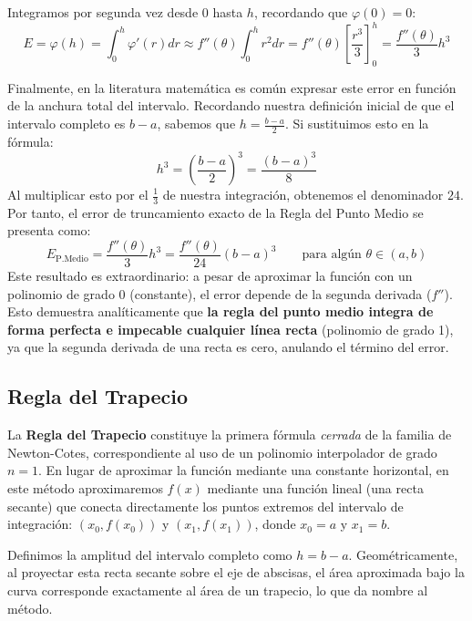 Integramos por segunda vez desde $0$ hasta $h$, recordando que $\varphi(0) = 0$:
\[
    E = \varphi(h) = \int_0^h \varphi'(r) dr \approx f''(\theta) \int_0^h r^2 dr = f''(\theta) \left[ \frac{r^3}{3} \right]_0^h = \frac{f''(\theta)}{3} h^3
\]

Finalmente, en la literatura matemática es común expresar este error en función de la anchura total del intervalo. Recordando nuestra definición inicial de que el intervalo completo es $b-a$, sabemos que $h = \frac{b-a}{2}$. Si sustituimos esto en la fórmula:
\[
    h^3 = \left(\frac{b-a}{2}\right)^3 = \frac{(b-a)^3}{8}
\]
Al multiplicar esto por el $\frac{1}{3}$ de nuestra integración, obtenemos el denominador $24$. Por tanto, el error de truncamiento exacto de la Regla del Punto Medio se presenta como:
\[
    \boxed{E_{\text{P.Medio}} = \frac{f''(\theta)}{3} h^3 = \frac{f''(\theta)}{24} (b-a)^3} \qquad \text{para algún } \theta \in (a, b)
\]
Este resultado es extraordinario: a pesar de aproximar la función con un polinomio de grado 0 (constante), el error depende de la segunda derivada ($f''$). Esto demuestra analíticamente que \textbf{la regla del punto medio integra de forma perfecta e impecable cualquier línea recta} (polinomio de grado 1), ya que la segunda derivada de una recta es cero, anulando el término del error.

\subsection{Regla del Trapecio}

La \textbf{Regla del Trapecio} constituye la primera fórmula \textit{cerrada} de la familia de Newton-Cotes, correspondiente al uso de un polinomio interpolador de grado $n = 1$. En lugar de aproximar la función mediante una constante horizontal, en este método aproximaremos $f(x)$ mediante una función lineal (una recta secante) que conecta directamente los puntos extremos del intervalo de integración: $(x_0, f(x_0))$ y $(x_1, f(x_1))$, donde $x_0 = a$ y $x_1 = b$.

Definimos la amplitud del intervalo completo como $h = b - a$. Geométricamente, al proyectar esta recta secante sobre el eje de abscisas, el área aproximada bajo la curva corresponde exactamente al área de un trapecio, lo que da nombre al método.

